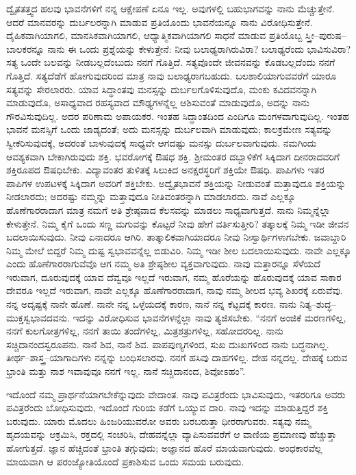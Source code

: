 ದ್ವೈತತತ್ತ್ವದ ಹಲವು ಭಾವನೆಗಳಿಗೆ ನನ್ನ ಆಕ್ಷೇಪಣೆ ಏನೂ ಇಲ್ಲ. ಅವುಗಳಲ್ಲಿ ಬಹುಭಾಗವನ್ನು ನಾನು ಮೆಚ್ಚುತ್ತೇನೆ. ಆದರೆ ಮಾನವರನ್ನು ದುರ್ಬಲರನ್ನಾಗಿ ಮಾಡುವ ಪ್ರತಿಯೊಂದು ಭಾವನೆಯನ್ನೂ ನಾನು ವಿರೋಧಿಸುತ್ತೇನೆ. ದೈಹಿಕವಾಗಿಯಾಗಲಿ, ಮಾನಸಿಕವಾಗಿಯಾಗಲಿ, ಆಧ್ಯಾತ್ಮಿಕವಾಗಿಯಾಗಲಿ ಸಾಧನೆ ಮಾಡುವ ಪ್ರತಿಯೊಬ್ಬ ಸ್ತ್ರೀ–ಪುರುಷ–ಬಾಲಕರನ್ನೂ ನಾನು ಈ ಒಂದು ಪ್ರಶ್ನೆಯನ್ನು ಕೇಳುತ್ತೇನೆ: ನೀವು ಬಲಾಢ್ಯರಾಗಿರುವಿರಾ? ಬಲಾಢ್ಯರೆಂದು ಭಾವಿಸುವಿರಾ? ಸತ್ಯ ಒಂದೇ ಬಲವನ್ನು ನೀಡಬಲ್ಲದೆಂಬುದು ನನಗೆ ಗೊತ್ತಿದೆ. ಸತ್ಯವೊಂದೇ ಜೀವನವನ್ನು ಕೊಡಬಲ್ಲದೆಂದು ನನಗೆ ಗೊತ್ತಿದೆ. ಸತ್ಯದೆಡೆಗೆ ಹೋಗುವುದರಿಂದ ಮಾತ್ರ ನಾವು ಬಲಾಢ್ಯರಾಗಬಹುದು. ಬಲಶಾಲಿಯಾಗುವವರೆಗೆ ಯಾರೂ ಸತ್ಯವನ್ನು ಸೇರಲಾರರು. ಯಾವ ಸಿದ್ಧಾಂತವು ಮನಸ್ಸನ್ನು ದುರ್ಬಲಗೊಳಿಸುವುದೊ, ಮಂಕು ಕವಿದವನನ್ನಾಗಿ ಮಾಡುವುದೊ, ಅಸಾಧ್ಯವಾದ ರಹಸ್ಯವಾದ ಮೌಢ್ಯಗಳನ್ನೆಲ್ಲ ಆಶಿಸುವಂತೆ ಮಾಡುವುದೊ, ಅದನ್ನು ನಾನು ಗೌರವಿಸುವುದಿಲ್ಲ. ಅದರ ಪರಿಣಾಮ ಅಪಾಯಕರ. ಇಂತಹ ಸಿದ್ಧಾಂತದಿಂದ ಎಂದಿಗೂ ಮಂಗಳವಾಗುವುದಿಲ್ಲ. ಇಂತಹ ಭಾವನೆ ಮನಸ್ಸಿಗೆ ಒಂದು ಜಾಡ್ಯದಂತೆ; ಅದು ಮನಸ್ಸನ್ನು ದುರ್ಬಲವಾಗಿ ಮಾಡುವುದು; ಕಾಲಕ್ರಮೇಣ ಸತ್ಯವನ್ನು ಸ್ವೀಕರಿಸುವುದಕ್ಕೆ, ಅದರಂತೆ ಬಾಳುವುದಕ್ಕೆ ಸಾಧ್ಯವೇ ಆಗದಷ್ಟು ಮನಸ್ಸು ದುರ್ಬಲವಾಗುವುದು. ನಮಗಿಂದು ಆವಶ್ಯಕವಾಗಿ ಬೇಕಾಗಿರುವುದು ಶಕ್ತಿ. ಭವರೋಗಕ್ಕೆ ಔಷಧ ಶಕ್ತಿ. ಶ‍್ರೀಮಂತರ ದಬ್ಬಾಳಿಕೆಗೆ ಸಿಕ್ಕಿದಾಗ ದೀನರಾದವರಿಗೆ ಶಕ್ತಿರೂಪದ ಔಷಧಿಬೇಕು. ವಿದ್ಯಾವಂತರ ತುಳಿತಕ್ಕೆ ಸಿಲುಕಿದ ಅನಕ್ಷರಸ್ಥರಿಗೆ ಶಕ್ತಿಯೇ ಔಷಧಿ. ಪಾಪಿಗಳು ಇತರ ಪಾಪಿಗಳ ಉಪಟಳಕ್ಕೆ ಸಿಕ್ಕಿದಾಗ ಅವರಿಗೆ ಶಕ್ತಿಬೇಕು. ಅದ್ವೈತಭಾವನೆ ಶಕ್ತಿಯನ್ನು ನೀಡುವಂತೆ ಮತ್ತಾವುದೂ ಶಕ್ತಿಯನ್ನು ನೀಡಲಾರದು; ಅದರಷ್ಟು ನಮ್ಮನ್ನು ಮತ್ತಾವುದೂ ನೀತಿವಂತರನ್ನಾಗಿ ಮಾಡಲಾರದು. ನಾವೆ ಎಲ್ಲಕ್ಕೂ ಹೊಣೆಗಾರರಾದಾಗ ಮಾತ್ರ ನಮಗೆ ಅತಿ ಶ್ರೇಷ್ಠವಾದ ಕೆಲಸವನ್ನು ಮಾಡಲು ಸಾಧ್ಯವಾಗುತ್ತದೆ. ನಾನು ನಿಮ್ಮನ್ನೆಲ್ಲಾ ಕೇಳುತ್ತೇನೆ. ನಿಮ್ಮ ಕೈಗೆ ಒಂದು ಸಣ್ಣ ಮಗುವನ್ನು ಕೊಟ್ಟರೆ ನೀವು ಹೇಗೆ ವರ್ತಿಸುತ್ತೀರಿ? ತತ್ಕಾಲಕ್ಕೆ ನಿಮ್ಮ ಇಡೀ ಜೀವನ ಬದಲಾಯಿಸುವುದು. ನೀವು ಏನಾದರೂ ಆಗಿರಿ. ತಾತ್ಕಾಲಿಕವಾಗಿಯಾದರೂ ನೀವು ನಿಃಸ್ವಾರ್ಥಿಗಳಾಗಬೇಕು. ಜವಾಬ್ದಾರಿ ನಿಮ್ಮ ಮೇಲೆ ಬಿದ್ದರೆ ನಿಮ್ಮ ದುಷ್ಟ ಸ್ವಭಾವವನ್ನೆಲ್ಲ ಬಿಡುವಿರಿ. ನಿಮ್ಮ ಇಡೀ ಶೀಲ ಬದಲಾಯಿಸುವುದು. ನಾವೇ ಎಲ್ಲಕ್ಕೂ ಎಂದು ಹೊಣೆಗಾರರಾಗುವೆವೊ ಆಗ ನಮ್ಮ ಅತಿ ಶ್ರೇಷ್ಠಶೀಲ ವ್ಯಕ್ತವಾಗುವುದು. ನಾವು ಮತ್ತಾರನ್ನೂ ಸೆಳೆಯದೆ ಇರುವಾಗ, ದೂರುವುದಕ್ಕೆ ಯಾವ ದೆವ್ವವೂ ಇಲ್ಲದೆ ಇರುವಾಗ, ನಮ್ಮ ಹೊರೆಯನ್ನು ಹೊರುವುದಕ್ಕೆ ಯಾವ ಸಾಕಾರ ದೇವರೂ ಇಲ್ಲದೆ ಇರುವಾಗ, ನಾವೇ ಎಲ್ಲಕ್ಕೂ ಹೊಣೆಗಾರರಾದಾಗ, ನಾವು ನಮ್ಮ ಶೀಲದ ಭವ್ಯ ಶಿಖರಕ್ಕೆ ಏರುವೆವು. ನನ್ನ ಅದೃಷ್ಟಕ್ಕೆ ನಾನೇ ಹೊಣೆ. ನಾನೇ ನನ್ನ ಒಳ್ಳೆಯದಕ್ಕೆ ಕಾರಣ, ನಾನೆ ನನ್ನ ಕೆಟ್ಟದಕ್ಕೆ ಕಾರಣ. ನಾನು ನಿತ್ಯ–ಶುದ್ಧ–ಮುಕ್ತಸ್ವಭಾವದವನು. ಇದನ್ನು ವಿರೋಧಿಸುವ ಭಾವನೆಗಳನ್ನೆಲ್ಲಾ ನಾವು ತ್ಯಜಿಸಬೇಕು. “ನನಗೆ ಅಂಜಿಕೆ ಮರಣಗಳಿಲ್ಲ, ನನಗೆ ಕುಲಗೋತ್ರಗಳಿಲ್ಲ, ನನಗೆ ತಾಯಿ ತಂದೆಗಳಿಲ್ಲ, ಮಿತ್ರಶತ್ರುಗಳಿಲ್ಲ, ಸಹೋದರರಿಲ್ಲ. ನಾನು ಸಚ್ಚಿದಾನಂದಸ್ವರೂಪನು. ನಾನೆ ಶಿವ, ನಾನೆ ಶಿವ. ಪಾಪಪುಣ್ಯಗಳಿಂದ, ಸುಖ ದುಃಖಗಳಿಂದ ನಾನು ಬದ್ಧನಾಗಿಲ್ಲ. ತೀರ್ಥ–ಶಾಸ್ತ್ರ–ಯಾಗಾದಿಗಳು ನನ್ನನ್ನು ಬಂಧಿಸಲಾರವು. ನನಗೆ ಹಸಿವು ದಾಹಗಳಿಲ್ಲ. ದೇಹ ನನ್ನದಲ್ಲ. ದೇಹಕ್ಕೆ ಬರುವ ಭ್ರಾಂತಿ ಮತ್ತು ನಾಶ ಇವಾವುವೂ ನನಗೆ ಇಲ್ಲ. ನಾನೆ ಸಚ್ಚಿದಾನಂದ, ಶಿವೋಽಹಂ”.

\vskip 0.2cm

ಇದೊಂದೆ ನಮ್ಮ ಪ್ರಾರ್ಥನೆಯಾಗಬೇಕೆನ್ನುವುದು ವೇದಾಂತ. ನಾವು ಪವಿತ್ರರೆಂದು ಭಾವಿಸುವುದು, ಇತರರಿಗೂ ಅವರು ಪವಿತ್ರರೆಂದು ಬೋಧಿಸುವುದು, ಇದೊಂದೆ ಗುರಿಯ ಕಡೆಗೆ ಒಯ್ಯುವ ದಾರಿ. ನಾವು ಇದನ್ನು ಮಾಡುತ್ತಿದ್ದರೆ ಶಕ್ತಿ ಬರುವುದು. ಯಾರು ಮೊದಲು ಹಿಂಜರಿಯುವರೋ ಅವರು ಬರಬರುತ್ತಾ ಧೀರರಾಗುವರು. ಸತ್ಯವು ನಮ್ಮ ಹೃದಯವನ್ನು ಆಕ್ರಮಿಸಿ, ರಕ್ತದಲ್ಲಿ ಸಂಚರಿಸಿ, ದೇಹವನ್ನೆಲ್ಲಾ ವ್ಯಾಪಿಸುವವರೆಗೆ ಆ ವಾಣಿಯ ಪ್ರಮಾಣವು ಹೆಚ್ಚುತ್ತಾ ಹೋಗುತ್ತದೆ. ಜ್ಞಾನ ಹೆಚ್ಚಿದಂತೆ ಭ್ರಾಂತಿ ತಗ್ಗುವುದು; ಅಜ್ಞಾನದ ಹೊರೆ ಮಾಯವಾಗುವುದು. ಅಂಧಕಾರವೆಲ್ಲ ಮಾಯವಾಗಿ ಆ ಪರಂಜ್ಯೋತಿಯೊಂದೆ ಪ್ರಕಾಶಿಸುವ ಒಂದು ಸಮಯ ಬರುವುದು.


